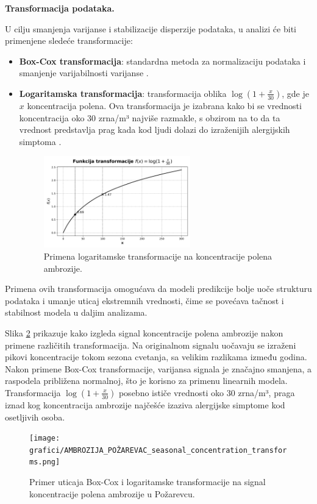 \documentclass[12pt]{article}
\begin{document}
\bigskip

\textbf{Transformacija podataka.}

U cilju smanjenja varijanse i stabilizacije disperzije podataka, u analizi će biti primenjene sledeće transformacije:

\begin{itemize}
    \item \textbf{Box-Cox transformacija}: standardna metoda za normalizaciju podataka i smanjenje varijabilnosti varijanse \cite{boxcox1964}.
    \item \textbf{Logaritamska transformacija}: transformacija oblika $\log(1 + \frac{x}{30})$, gde je $x$ koncentracija polena. Ova transformacija je izabrana kako bi se vrednosti koncentracija oko 30 zrna/m³ najviše razmakle, s obzirom na to da ta vrednost predstavlja prag kada kod ljudi dolazi do izraženijih alergijskih simptoma \cite{damato2007}.
    \begin{figure}[H]
        \centering
        \includegraphics[width=0.6\textwidth]{grafici/log1p.png}
        \caption{Primena logaritamske transformacije na koncentracije polena ambrozije.}
        \label{fig:log_transform}
    \end{figure}
    
\end{itemize}

Primena ovih transformacija omogućava da modeli predikcije bolje uoče strukturu podataka i umanje uticaj ekstremnih vrednosti, čime se povećava tačnost i stabilnost modela u daljim analizama.

Slika \ref{fig:ambrozija_transforms} prikazuje kako izgleda signal koncentracije polena ambrozije nakon primene različitih transformacija. Na originalnom signalu uočavaju se izraženi pikovi koncentracije tokom sezona cvetanja, sa velikim razlikama između godina. Nakon primene Box-Cox transformacije, varijansa signala je značajno smanjena, a raspodela približena normalnoj, što je korisno za primenu linearnih modela. Transformacija $\log(1 + \frac{x}{30})$ posebno ističe vrednosti oko 30 zrna/m³, praga iznad kog koncentracija ambrozije najčešće izaziva alergijske simptome kod osetljivih osoba.
\begin{figure}[H]
    \centering
    \texttt{[image: grafici/AMBROZIJA\_POŽAREVAC\_seasonal\_concentration\_transforms.png]}
    \caption{Primer uticaja Box-Cox i logaritamske transformacije na signal koncentracije polena ambrozije u Požarevcu.}
    \label{fig:ambrozija_transforms}
\end{figure}
\end{document}
